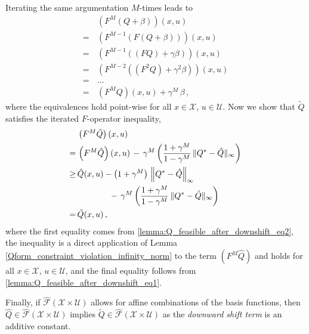 \documentclass[journal]{IEEEtran}
\newcommand{\kcol}[1]{{\color{black}#1}}
\newcommand{\mcal}{\mathcal}
\begin{document}
\begin{IEEEproof}
	Iterating the same argumentation $M$-times leads to
	\begin{equation} \label{lemma:Q_feasible_after_downshift_eq2}
		\begin{aligned}
			&\, \left( F^M \left(Q + \beta \right) \right)(x,u)
			\\
			=&\, \left( F^{M-1} \left( F \left( Q + \beta \right) \right) \right)(x,u) 
			\\
			=&\, \left( F^{M-1} \left( \left(F Q \right) + \gamma \beta \right) \right)(x,u) 
			\\
			=&\, \left( F^{M-2} \left( \left(F^2 Q \right) + \gamma^2 \beta \right) \right)(x,u) 
			\\
			=&\, \dots
			\\
			=&\, \left(F^M Q\right)(x,u) + \gamma^M \, \beta
\,,
		\end{aligned}
	\end{equation}
	where the equivalences hold point-wise for all $x \in \mcal{X}$, $u \in \mcal{U}$. Now we show that $\tilde{Q}$ satisfies the iterated $F$-operator inequality,
	\begin{equation} \nonumber
		\begin{aligned}
			&\, \left( F^M \tilde{Q} \right)(x,u)
			\\
			=&\, \left( F^M \hat{Q} \right)(x,u) \,-\, \gamma^M \left( \frac{1+\gamma^M}{1-\gamma^M} \, \| Q^\ast - \hat{Q} \|_\infty \right)
			\\
			\kcol{\geq}&\, \kcol{\hat{Q}(x,u) - \left(1+\gamma^M\right) \, \left\| Q^\ast - \hat{Q} \right\|_\infty}
				\\
				&\qquad\qquad-\, \gamma^M \left( \frac{1+\gamma^M}{1-\gamma^M} \, \| Q^\ast - \hat{Q} \|_\infty \right)
			\\
			=&\, \tilde{Q}(x,u)
				\,,
		\end{aligned}
	\end{equation}
	where the first equality comes from \eqref{lemma:Q_feasible_after_downshift_eq2}, the inequality is a direct application of Lemma \ref{Qform_constraint_violation_infinity_norm} to the term $(F^M \hat{Q})$ and holds for all $x\in\mcal{X}$, $u\in\mcal{U}$, and the final equality follows from \eqref{lemma:Q_feasible_after_downshift_eq1}.
	
	
	Finally, if $\hat{\mcal{F}}(\mcal{X} \times \mcal{U})$ allows for affine combinations of the basis functions, then $\hat{Q}\in\hat{\mcal{F}}(\mcal{X} \times \mcal{U})$ implies $\tilde{Q} \in \hat{\mcal{F}}(\mcal{X} \times \mcal{U})$ as the \emph{downward shift term} is an additive constant.
\end{IEEEproof}
\end{document}
